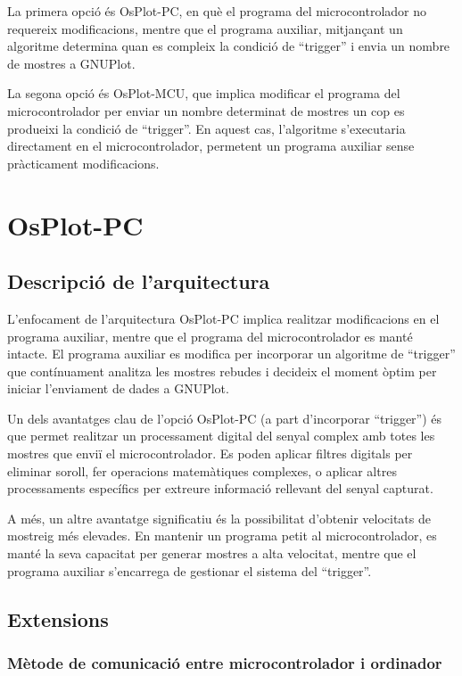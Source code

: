 \documentclass{tfgitic}[2023/06/30]
\begin{document}
La primera opció és OsPlot-PC, en què el programa del microcontrolador
no requereix modificacions, mentre que el programa auxiliar,
mitjançant un algoritme determina quan es compleix la condició de
``trigger'' i envia un nombre de mostres a GNUPlot.

La segona opció és OsPlot-MCU, que implica modificar el programa del
microcontrolador per enviar un nombre determinat de mostres un cop es
produeixi la condició de ``trigger''. En aquest cas, l'algoritme
s'executaria directament en el microcontrolador, permetent un programa
auxiliar sense pràcticament modificacions.

\newpage

\section{OsPlot-PC}

\subsection{Descripció de l'arquitectura}

L'enfocament de l'arquitectura OsPlot-PC implica realitzar
modificacions en el programa auxiliar, mentre que el programa del
microcontrolador es manté intacte. El programa auxiliar es modifica
per incorporar un algoritme de ``trigger'' que contínuament analitza
les mostres rebudes i decideix el moment òptim per iniciar l'enviament
de dades a GNUPlot.

Un dels avantatges clau de l'opció OsPlot-PC (a part d'incorporar
``trigger'') és que permet realitzar un processament digital del
senyal complex amb totes les mostres que enviï el microcontrolador. Es
poden aplicar filtres digitals per eliminar soroll, fer operacions
matemàtiques complexes, o aplicar altres processaments específics per
extreure informació rellevant del senyal capturat.

A més, un altre avantatge significatiu és la possibilitat d'obtenir
velocitats de mostreig més elevades. En mantenir un programa petit al
microcontrolador, es manté la seva capacitat per generar mostres a
alta velocitat, mentre que el programa auxiliar s'encarrega de
gestionar el sistema del ``trigger''.

\subsection{Extensions}
\label{subsec:extensions-osplot-pc}

\subsubsection{Mètode de comunicació entre microcontrolador i ordinador}
\end{document}
